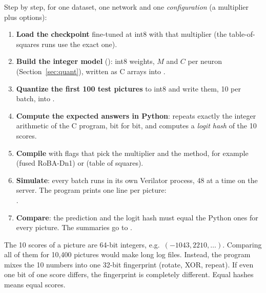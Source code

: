 Step by step, for one dataset, one network and one \emph{configuration} (a multiplier plus options):
\begin{enumerate}
  \item \textbf{Load the checkpoint} fine-tuned at int8 with that multiplier (the table-of-squares runs use the
        exact one).
  \item \textbf{Build the integer model} (): int8 weights, $M$ and $C$ per neuron
        (Section~\ref{sec:quant}), written as C arrays into .
  \item \textbf{Quantize the first 100 test pictures} to int8 and write them, 10 per batch, into
        .
  \item \textbf{Compute the expected answers in Python}:  repeats exactly the integer
        arithmetic of the C program, bit for bit, and computes a \emph{logit hash} of the 10 scores.
  \item \textbf{Compile}  with flags that pick the multiplier and the method, for example
         (fused RoBA-Dn1) or  (table of squares).
  \item \textbf{Simulate}: every batch runs in its own Verilator process, 48 at a time on the server.
        The program prints one line per picture:\\
        {\footnotesize{}}.
  \item \textbf{Compare}: the prediction and the logit hash must equal the Python ones for every picture.
        The summaries go to .
\end{enumerate}

\begin{example}
The 10 scores of a picture are 64-bit integers, e.g.\ $(-1043, 2210, \dots)$. Comparing all of them for
10{,}400 pictures would make long log files. Instead, the program mixes the 10 numbers into one 32-bit
fingerprint (rotate, XOR, repeat). If even one bit of one score differs, the fingerprint is completely
different. Equal hashes means equal scores.
\end{example}

